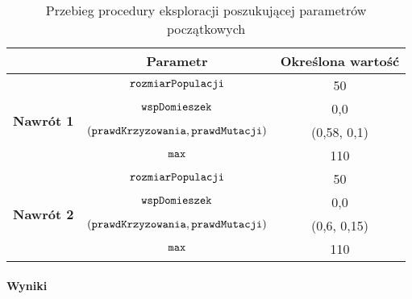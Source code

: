 \documentclass[./FM_mgr.tex]{subfiles}
\begin{document}

\begin{table}[h]
	\caption{Przebieg procedury eksploracji poszukującej parametrów początkowych \label{table:tsp_tweak_flow}}
	\centering
	\begin{tabular}{c|c|c|}
		\cline{2-3}
		& {\bf Parametr}                                     & {\bf Określona wartość} \\ \hline
		\multicolumn{1}{|c|}{\multirow{4}{*}{{\bf Nawrót 1}}} & $\mathtt{rozmiarPopulacji}$                         & 50                      \\ \cline{2-3} 
		\multicolumn{1}{|c|}{}                                & $\mathtt{wspDomieszek}$                             & 0,0                     \\ \cline{2-3} 
		\multicolumn{1}{|c|}{}                                & $(\mathtt{prawdKrzyzowania}, \mathtt{prawdMutacji})$ & (0,58, 0,1)             \\ \cline{2-3} 
		\multicolumn{1}{|c|}{}                                & $\mathtt{max}$                                      & 110                     \\ \hline \hline
		\multicolumn{1}{|c|}{\multirow{4}{*}{{\bf Nawrót 2}}} & $\mathtt{rozmiarPopulacji}$                         & 50                      \\ \cline{2-3} 
		\multicolumn{1}{|c|}{}                                & $\mathtt{wspDomieszek}$                             & 0,0                     \\ \cline{2-3} 
		\multicolumn{1}{|c|}{}                                & $(\mathtt{prawdKrzyzowania}, \mathtt{prawdMutacji})$ & (0,6, 0,15)             \\ \cline{2-3} 
		\multicolumn{1}{|c|}{}                                & $\mathtt{max}$                                      & 110                     \\ \hline
	\end{tabular}
\end{table}	

\paragraph{Wyniki}
\end{document}
